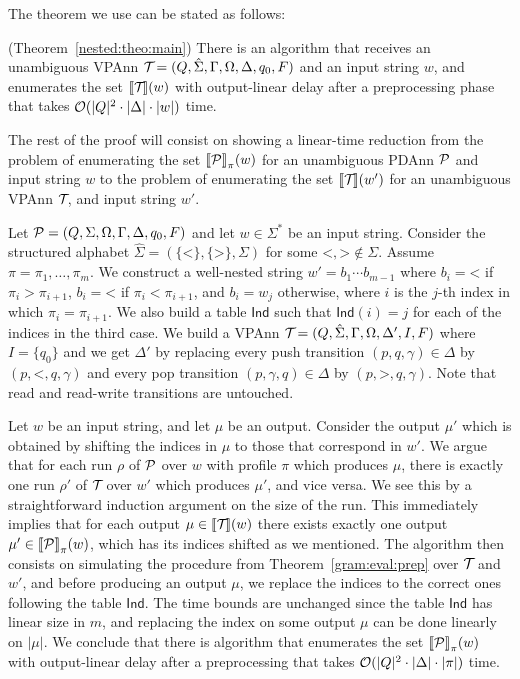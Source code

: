 The theorem we use can be stated as follows:

\begin{theorem}{(Theorem~\ref{nested:theo:main})}\label{gram:eval:prep}
	There is an algorithm that receives an unambiguous VPAnn $\mathcal{T}\! = (Q, \hat{\Sigma}, \Gamma, \Omega, \Delta, q_0, F)$ and an input string $w$, and enumerates the set ${\llbracket{\mathcal{T}\!}\rrbracket}(w)$ with output-linear delay after a preprocessing phase that takes $\mathcal{O}(|Q|^2 \cdot \vert\Delta\vert \cdot |w|)$ time.
\end{theorem}

The rest of the proof will consist on showing a linear-time reduction from the problem of enumerating the set ${\llbracket{\mathcal{P}}\rrbracket}_{\pi}(w)$ for an unambiguous PDAnn $\mathcal{P}$ and input string $w$ to the problem of enumerating the set ${\llbracket{\mathcal{T}\!}\rrbracket}(w')$ for an unambiguous VPAnn $\mathcal{T}\!$, and input string $w'$.

Let $\mathcal{P} = (Q, \Sigma, \Omega, \Gamma, \Delta, q_0, F)$ and let $w\in \Sigma^*$ be an input string.
Consider the structured alphabet $\hat{\Sigma} = (\{\texttt{<}\}, \{\texttt{>}\}, \Sigma)$ for some $\texttt{<}, \texttt{>}\not\in\Sigma$. Assume $\pi = \pi_1, \ldots, \pi_m$.
We construct a well-nested string $w' = b_1\cdots b_{m-1}$ where $b_i = 
\texttt{<}$ if $\pi_i > \pi_{i+1}$, $b_i = \texttt{<}$ if $\pi_i < \pi_{i+1}$, and $b_i  = w_j$ otherwise, where $i$ is the $j$-th index in which $\pi_i = \pi_{i+1}$.
We also build a table $\mathsf{Ind}$ such that $\mathsf{Ind}(i) = j$ for each of the indices in the third case.
We build a VPAnn $\mathcal{T}\! = (Q, \hat{\Sigma}, \Gamma, \Omega, \Delta', I, F)$ where $I = \{q_0\}$ and we get $\Delta'$ by replacing every push transition $(p, q, \gamma)\in \Delta$ by $(p, \texttt{<}, q, \gamma)$ and every pop transition $(p,\gamma,q)\in\Delta$ by $(p, \texttt{>}, q, \gamma)$. Note that read and read-write transitions are untouched.

Let $w$ be an input string, and let $\mu$ be an output. Consider the output $\mu'$ which is obtained by shifting the indices in $\mu$ to those that correspond in $w'$. We argue that for each run $\rho$ of $\mathcal{P}$ over $w$ with profile $\pi$ which produces $\mu$, there is exactly one run $\rho'$ of $\mathcal{T}\!$ over $w'$ which produces $\mu'$, and vice versa. We see this by a straightforward induction argument on the size of the run. This immediately implies that for each output $\mu\in{\llbracket{\mathcal{T}\!}\rrbracket}(w)$ there exists exactly one output $\mu'\in{\llbracket{\mathcal{P}}\rrbracket}_{\pi}(w)$, which has its indices shifted as we mentioned.
The algorithm then consists on simulating the procedure from Theorem~\ref{gram:eval:prep} over $\mathcal{T}\!$ and $w'$, and before producing an output $\mu$, we replace the indices to the correct ones following the table  $\mathsf{Ind}$. The time bounds are unchanged since the table $\mathsf{Ind}$ has linear size in $m$, and replacing the index on some output $\mu$ can be done linearly on $|\mu|$. We conclude that there is algorithm that enumerates the set ${\llbracket{\mathcal{P}}\rrbracket}_{\pi}(w)$ with output-linear delay after a preprocessing that takes $\mathcal{O}(|Q|^2\cdot \vert\Delta\vert\cdot |\pi|)$ time.
